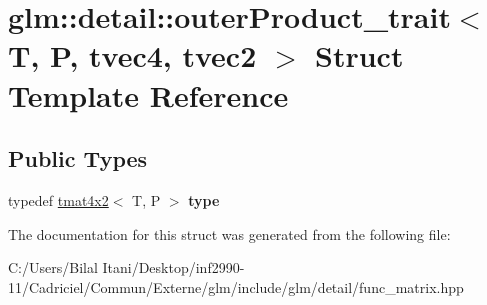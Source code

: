 \hypertarget{structglm_1_1detail_1_1outer_product__trait_3_01_t_00_01_p_00_01tvec4_00_01tvec2_01_4}{}\section{glm\+:\+:detail\+:\+:outer\+Product\+\_\+trait$<$ T, P, tvec4, tvec2 $>$ Struct Template Reference}
\label{structglm_1_1detail_1_1outer_product__trait_3_01_t_00_01_p_00_01tvec4_00_01tvec2_01_4}
\subsection*{Public Types}
\begin{DoxyCompactItemize}
\item 
typedef \hyperlink{structglm_1_1detail_1_1tmat4x2}{tmat4x2}$<$ T, P $>$ {\bfseries type}\hypertarget{structglm_1_1detail_1_1outer_product__trait_3_01_t_00_01_p_00_01tvec4_00_01tvec2_01_4_a15cc3a28bd3e09c75a19ce0349c76d9a}{}\label{structglm_1_1detail_1_1outer_product__trait_3_01_t_00_01_p_00_01tvec4_00_01tvec2_01_4_a15cc3a28bd3e09c75a19ce0349c76d9a}

\end{DoxyCompactItemize}


The documentation for this struct was generated from the following file\+:\begin{DoxyCompactItemize}
\item 
C\+:/\+Users/\+Bilal Itani/\+Desktop/inf2990-\/11/\+Cadriciel/\+Commun/\+Externe/glm/include/glm/detail/func\+\_\+matrix.\+hpp\end{DoxyCompactItemize}
